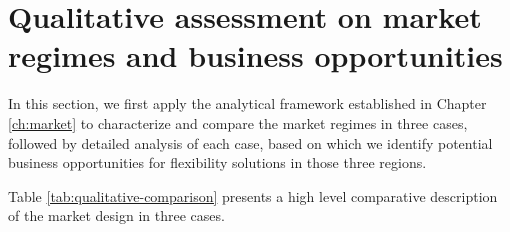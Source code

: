 \section[Qualitative assessment on market regimes and business opportunities]{Qualitative assessment on market regimes and business opportunities%
	}
\label{sec:qualitative-analysis}

In this section, we first apply the analytical framework established in Chapter \ref{ch:market} to characterize and compare the market regimes in three cases, followed by detailed analysis of each case, based on which we identify potential business opportunities for flexibility solutions in those three regions.

Table \ref{tab:qualitative-comparison} presents a high level comparative description of the market design in three cases.


